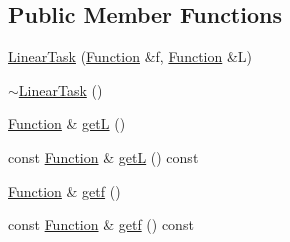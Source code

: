 \subsection*{Public Member Functions}
\begin{DoxyCompactItemize}
\item 
\hyperlink{classocra_1_1LinearTask_a6bbf60a2fde8bd52c79d3d26613f06a0}{Linear\+Task} (\hyperlink{classocra_1_1Function}{Function} \&f, \hyperlink{classocra_1_1Function}{Function} \&L)
\item 
\hyperlink{classocra_1_1LinearTask_ad443b3044cc66e3e68ea3f5062e37453}{$\sim$\+Linear\+Task} ()
\item 
\hyperlink{classocra_1_1Function}{Function} \& \hyperlink{classocra_1_1LinearTask_a84dc8ca9c882d3e1b864e78784814303}{getL} ()
\item 
const \hyperlink{classocra_1_1Function}{Function} \& \hyperlink{classocra_1_1LinearTask_a7b2e597930a2b446c6fe50a5e34c8933}{getL} () const 
\item 
\hyperlink{classocra_1_1Function}{Function} \& \hyperlink{classocra_1_1LinearTask_a64b0390b8b65bcd5a533c0b6774615ec}{getf} ()
\item 
const \hyperlink{classocra_1_1Function}{Function} \& \hyperlink{classocra_1_1LinearTask_a94b17fc4d53c11b676da8bcea416d94a}{getf} () const 
\end{DoxyCompactItemize}
